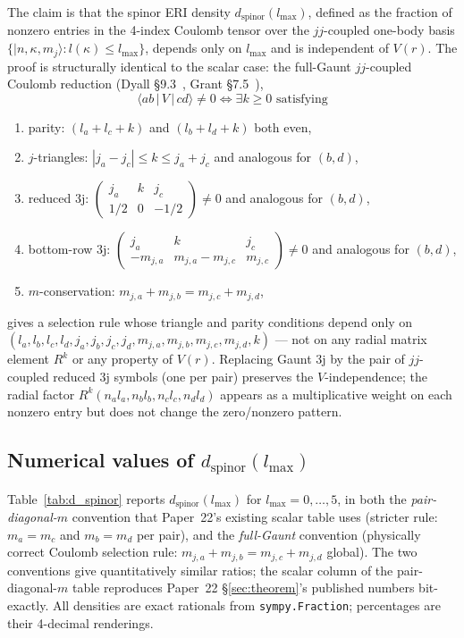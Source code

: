 \documentclass[twocolumn,pra,amsmath,amssymb,superscriptaddress]{revtex4-2}
\begin{document}
The claim is that the spinor ERI density
$d_{\mathrm{spinor}}(l_{\max})$, defined as the fraction of nonzero
entries in the 4-index Coulomb tensor over the $jj$-coupled
one-body basis $\{|n, \kappa, m_j\rangle : l(\kappa) \leq l_{\max}\}$,
depends only on $l_{\max}$ and is independent of $V(r)$.
The proof is structurally identical to the scalar case: the full-Gaunt
$jj$-coupled Coulomb reduction
(Dyall \S 9.3~\cite{Dyall}, Grant \S 7.5~\cite{Grant}),
\[
  \langle a b \,|\, V \,|\, c d \rangle \neq 0
  \iff \exists k \geq 0 \text{ satisfying}
\]
\begin{enumerate}
  \item parity: $(l_a + l_c + k)$ and $(l_b + l_d + k)$ both even,
  \item $j$-triangles: $|j_a - j_c| \leq k \leq j_a + j_c$ and analogous for $(b, d)$,
  \item reduced 3j: $\left(\begin{smallmatrix} j_a & k & j_c \\ 1/2 & 0 & -1/2\end{smallmatrix}\right) \neq 0$ and analogous for $(b, d)$,
  \item bottom-row 3j: $\left(\begin{smallmatrix} j_a & k & j_c \\ -m_{j,a} & m_{j,a} - m_{j,c} & m_{j,c}\end{smallmatrix}\right) \neq 0$ and analogous for $(b, d)$,
  \item $m$-conservation: $m_{j,a} + m_{j,b} = m_{j,c} + m_{j,d}$,
\end{enumerate}
gives a selection rule whose triangle and parity conditions depend
only on $(l_a, l_b, l_c, l_d, j_a, j_b, j_c, j_d, m_{j,a}, m_{j,b}, m_{j,c}, m_{j,d}, k)$
--- not on any radial matrix element $R^k$ or any property of $V(r)$.
Replacing Gaunt 3j by the pair of $jj$-coupled reduced 3j symbols
(one per pair) preserves the $V$-independence; the radial factor
$R^k(n_a l_a, n_b l_b, n_c l_c, n_d l_d)$ appears as a
multiplicative weight on each nonzero entry but does not change the
zero/nonzero pattern.

\subsection{Numerical values of $d_{\mathrm{spinor}}(l_{\max})$}

Table~\ref{tab:d_spinor} reports $d_{\mathrm{spinor}}(l_{\max})$ for
$l_{\max} = 0, \dots, 5$, in both the \emph{pair-diagonal-$m$}
convention that Paper~22's existing scalar table uses (stricter rule:
$m_a = m_c$ and $m_b = m_d$ per pair), and the \emph{full-Gaunt}
convention (physically correct Coulomb selection rule:
$m_{j,a} + m_{j,b} = m_{j,c} + m_{j,d}$ global). The two conventions
give quantitatively similar ratios; the scalar column of the
pair-diagonal-$m$ table reproduces Paper~22 \S\ref{sec:theorem}'s
published numbers bit-exactly. All densities are exact rationals
from \texttt{sympy.Fraction}; percentages are their 4-decimal
renderings.
\end{document}
